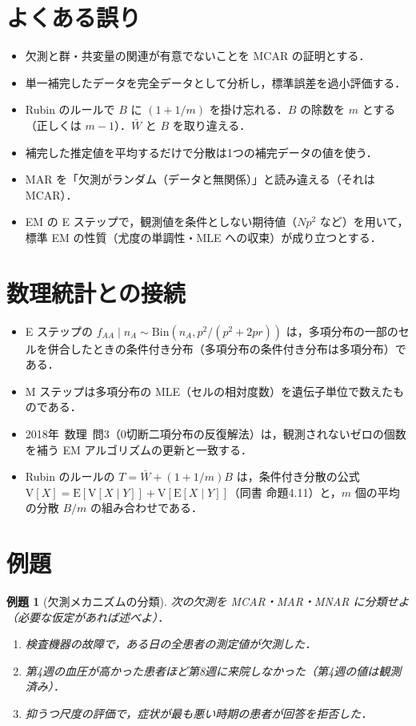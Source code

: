 \documentclass[a4paper,11pt,openany]{ltjsbook}
\newtheorem{reidai}{例題}[chapter]
\newcommand{\kakomonSM}[2]{\mbox{#1年 数理 問#2}}
\newcommand{\E}{\mathrm{E}}
\newcommand{\V}{\mathrm{V}}
\newcommand{\Bin}{\mathrm{Bin}}
\begin{document}
\section{よくある誤り}\label{sec:16-err}
\begin{warnbox}
\begin{itemize}
\item 欠測と群・共変量の関連が有意でないことを MCAR の証明とする．
\item 単一補完したデータを完全データとして分析し，標準誤差を過小評価する．
\item Rubin のルールで $B$ に $(1+1/m)$ を掛け忘れる．$B$ の除数を $m$ とする（正しくは $m-1$）．$\bar W$ と $B$ を取り違える．
\item 補完した推定値を平均するだけで分散は1つの補完データの値を使う．
\item MAR を「欠測がランダム（データと無関係）」と読み違える（それは MCAR）．
\item EM の E ステップで，観測値を条件としない期待値（$Np^2$ など）を用いて，標準 EM の性質（尤度の単調性・MLE への収束）が成り立つとする．
\end{itemize}
\end{warnbox}

\section{数理統計との接続}\label{sec:16-link}
\begin{linkbox}
\begin{itemize}
\item E ステップの $f_{AA}\mid n_A\sim\Bin(n_A,p^2/(p^2+2pr))$ は，多項分布の一部のセルを併合したときの条件付き分布（多項分布の条件付き分布は多項分布）である．
\item M ステップは多項分布の MLE（セルの相対度数）を遺伝子単位で数えたものである．
\item \kakomonSM{2018}{3}（0切断二項分布の反復解法）は，観測されないゼロの個数を補う EM アルゴリズムの更新と一致する．
\item Rubin のルールの $T=\bar W+(1+1/m)B$ は，条件付き分散の公式 $\V[X]=\E[\V[X\mid Y]]+\V[\E[X\mid Y]]$（同書 命題4.11）と，$m$ 個の平均の分散 $B/m$ の組み合わせである．
\end{itemize}
\end{linkbox}

\section{例題}\label{sec:16-ex}
\begin{reidai}[欠測メカニズムの分類]\label{reidai:16-1}
次の欠測を MCAR・MAR・MNAR に分類せよ（必要な仮定があれば述べよ）．
\begin{enumerate}[label=(\arabic*)]
\item 検査機器の故障で，ある日の全患者の測定値が欠測した．
\item 第4週の血圧が高かった患者ほど第8週に来院しなかった（第4週の値は観測済み）．
\item 抑うつ尺度の評価で，症状が最も悪い時期の患者が回答を拒否した．
\end{enumerate}
\end{reidai}
\end{document}
